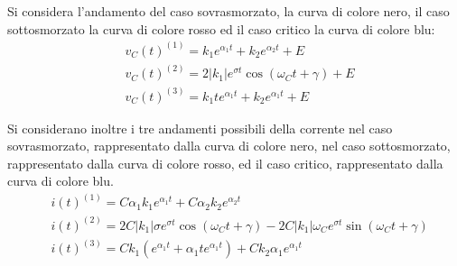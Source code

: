 \documentclass{article}
\numberwithin{equation}{subsection}
\begin{document}
Si considera l'andamento del caso sovrasmorzato, la curva di colore nero, il caso sottosmorzato la curva di colore rosso ed il caso critico la curva di colore blu: 
\begin{align*}
    &v_C(t)^{(1)}=k_1e^{\alpha_1t}+k_2e^{\alpha_2t}+E\\
    &v_C(t)^{(2)}=2|k_1|e^{\sigma t}\cos(\omega_Ct+\gamma)+E\\
    &v_C(t)^{(3)}=k_1te^{\alpha_1t}+k_2e^{\alpha_1t}+E
\end{align*}
\begin{center}
\end{center}
Si considerano inoltre i tre andamenti possibili della corrente nel caso sovrasmorzato, rappresentato dalla curva di colore nero, nel caso sottosmorzato, 
rappresentato dalla curva di colore rosso, ed il caso critico, rappresentato dalla curva di colore blu. 
\begin{align*}
    &i(t)^{(1)}=C\alpha_1k_1e^{\alpha_1t}+C\alpha_2k_2e^{\alpha_2t}\\
    &i(t)^{(2)}=2C|k_1|\sigma e^{\sigma t}\cos(\omega_Ct+\gamma)-2C|k_1|\omega_Ce^{\sigma t}\sin(\omega_Ct+\gamma)\\
    &i(t)^{(3)}=Ck_1(e^{\alpha_1t}+\alpha_1te^{\alpha_1t})+Ck_2\alpha_1e^{\alpha_1t}
\end{align*}
\begin{center}
\end{center}
\end{document}

